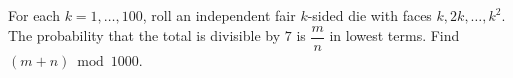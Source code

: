 For each $k=1,\ldots,100$, roll an independent fair $k$-sided die with faces $k,2k,\ldots,k^2$. The probability that the total is divisible by $7$ is $\dfrac{m}{n}$ in lowest terms. Find $(m+n)\bmod1000$.
